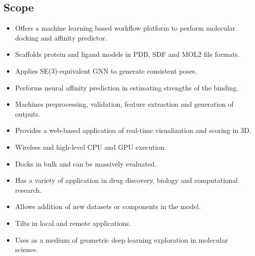 \documentclass[12pt,a4]{report}
\begin{document}
\subsection{Scope}
\hspace*{0.3in}
\begin{itemize}
    \item Offers a machine learning based workflow platform to perform molecular docking and affinity predictor.
    \item Scaffolds protein and ligand models in PDB, SDF and MOL2 file formats.
    \item Applies SE(3)-equivalent GNN to generate consistent poses.
    \item Performs neural affinity prediction in estimating strengths of the binding.
    \item Machines preprocessing, validation, feature extraction and generation of outputs.
    \item Provides a web-based application of real-time visualization and scoring in 3D.
    \item Wireless and high-level CPU and GPU execution.
    \item Docks in bulk and can be massively evaluated.
    \item Has a variety of application in drug discovery, biology and computational research.
    \item Allows addition of new datasets or components in the model.
    \item Tilts in local and remote applications.
    \item Uses as a medium of geometric deep learning exploration in molecular science.
\end{itemize}
\end{document}

